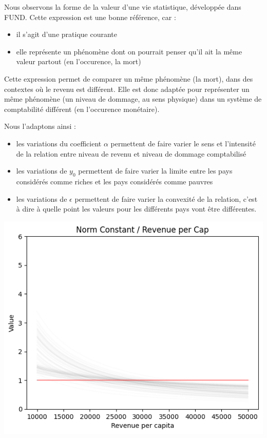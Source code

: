 \begin{methodbox}
Nous observons la forme de la valeur d'une vie statistique, développée dans FUND. Cette expression est une bonne référence, car : 

\begin{itemize}
    \item il s'agit d'une pratique courante
    \item elle représente un phénomène dont on pourrait penser qu'il ait la même valeur partout (en l'occurence, la mort)
\end{itemize}

Cette expression permet de comparer un même phénomène (la mort), dans des contextes où le revenu est différent. Elle est donc adaptée pour représenter un même phénomène (un niveau de dommage, au sens physique) dans un système de comptabilité différent (en l'occurence monétaire). 

Nous l'adaptons ainsi : 

\begin{itemize}
    \item les variations du coefficient $\alpha$ permettent de faire varier le sens et l'intensité de la relation entre niveau de revenu et niveau de dommage comptabilisé
    \item les variations de $y_0$ permettent de faire varier la limite entre les pays considérés comme riches et les pays considérés comme pauvres
    \item les variations de $\epsilon$ permettent de faire varier la convexité de la relation, c'est à dire à quelle point les valeurs pour les différents pays vont être différentes. 
\end{itemize}

\vspace{2cm}

\centering
\includegraphics[width=0.75\linewidth]{figures/coef.png}

\end{methodbox}
\begin{methodbox}


    
\end{methodbox}

